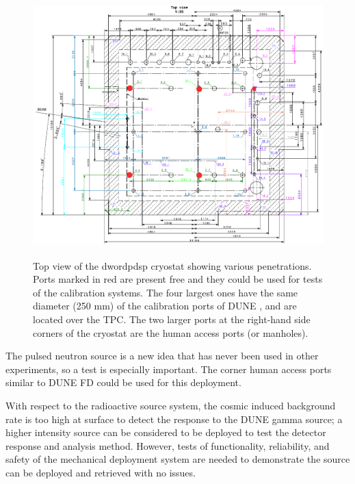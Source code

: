 \begin{figure}[tbp]
\centering
\includegraphics[height=4.0in]{graphics/protoDUNESP_topView_marked.png}
\caption{Top view of the dword{pdsp}
cryostat showing various penetrations. Ports marked in red are present free and they could be used for tests of the calibration systems. The four largest ones have the same diameter (250 mm) of the calibration ports of DUNE , and are located over the TPC. The two larger ports at the right-hand side corners of the cryostat are the human access ports (or manholes).}
\label{fig:pDmap}
\end{figure}

The pulsed neutron source is a new idea that has never been used in other experiments, so a  test is especially important. The corner human access ports similar to DUNE FD could be used for this deployment.

With respect to the radioactive source system, the cosmic induced background rate is too high at surface to detect the response to the DUNE gamma source; a higher intensity source can be considered to be deployed to test the detector response and analysis method. However, tests of functionality,  reliability, and safety of the mechanical deployment system are needed to demonstrate the source can be deployed and retrieved with no issues.


